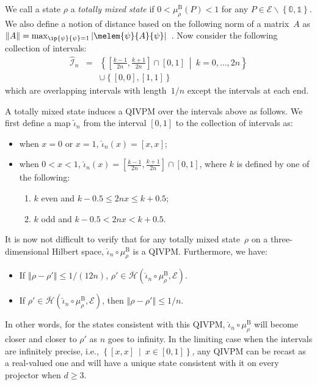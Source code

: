 \documentclass[english,reprint, aps, prl,superscriptaddress, showpacs,
showkeys, longbibliography, amsmath, amssymb]{revtex4-1}
\theoremstyle{plain}
\theoremstyle{definition}
\newcommand{\Hilb}{\mathcal{H}}
\newcommand{\events}{\ensuremath{\mathcal{E}}}
\newcommand{\set}[2]{\ensuremath{\left\{ {#1}~\middle|~{#2}\right\} }}
\newcommand{\coreBorn}{\ensuremath{\overline{\Hilb}}}
\begin{document}
We call a state $\rho$ a \emph{totally mixed state} if
$0<\mu_{\rho}^{\mathrm{B}}\left(P\right)<1$ for any
$P\in\events\backslash\left\{ \mathbb{0},\mathbb{1}\right\} $. We also
define a notion of distance based on the following norm of a
matrix~$A$ as
$\left\Vert A\right\Vert
=\max_{\ip{\psi}{\psi}=1}\left|\melem{\psi}{A}{\psi}\right|$~\citep{544199}. Now
consider the following collection of intervals:
\begin{eqnarray}
\widehat{\mathscr{I}}_{n} & = & \set{\left[\frac{k-1}{2n},\frac{k+1}{2n}\right]\cap\left[0,1\right]}{k=0,\ldots,2n}\nonumber \\
 &  & \cup\left\{ \left[0,0\right],\left[1,1\right]\right\} 
\end{eqnarray}
which are overlapping intervals with length~$1/n$ except the intervals
at each end. 

A totally mixed state induces a QIVPM over the intervals above as
follows. We first define a map $\widehat{\iota}_{n}$ from the interval
$[0,1]$ to the collection of intervals as:
\begin{itemize}
\item when $x=0$ or $x=1$, $\widehat{\iota}_{n}\left(x\right)=\left[x,x\right]$;
\item when $0<x<1$, $\widehat{\iota}_{n}\left(x\right)=\left[\frac{k-1}{2n},\frac{k+1}{2n}\right]\cap\left[0,1\right]$,
where $k$ is defined by one of the following:
\begin{enumerate}
\item $k$ even and $k-0.5\le2nx\le k+0.5$;
\item $k$ odd and $k-0.5<2nx<k+0.5$.
\end{enumerate}
\end{itemize}

It is now not difficult to verify that for any totally mixed
state~$\rho$ on a three-dimensional Hilbert space,
$\widehat{\iota}_{n}\circ\mu_{\rho}^{\mathrm{B}}$ is a
QIVPM. Furthermore, we have:
\begin{itemize}
\item If $\left\Vert \rho-\rho'\right\Vert \le1/\left(12n\right)$,
$\rho'\in\coreBorn\left(\widehat{\iota}_{n}\circ\mu_{\rho}^{\mathrm{B}},\events\right)$.
\item If $\rho'\in\coreBorn\left(\widehat{\iota}_{n}\circ\mu_{\rho}^{\mathrm{B}},\events\right)$,
then $\left\Vert \rho-\rho'\right\Vert \le1/n$.
\end{itemize}
In other words, for the states consistent with this QIVPM,
$\widehat{\iota}_{n}\circ\mu_{\rho}^{\mathrm{B}}$ will become closer and
closer to $\rho'$ as $n$ goes to infinity. In the limiting case when
the intervals are infinitely precise, i.e.,
$\set{\left[x,x\right]}{x\in\left[0,1\right]}$, any QIVPM can be
recast as a real-valued one and will have a unique state consistent
with it on every projector when $d\ge3$.
\end{document}

